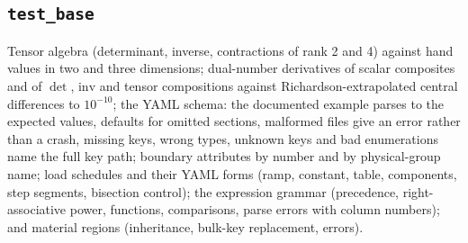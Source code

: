 \documentclass[11pt]{article}
\begin{document}
\subsection{\texttt{test\_base}}
Tensor algebra (determinant, inverse, contractions of rank 2 and 4) against
hand values in two and three dimensions; dual-number derivatives of scalar
composites and of $\det$, $\mathrm{inv}$ and tensor compositions against
Richardson-extrapolated central differences to $10^{-10}$; the YAML
schema: the documented example parses to the expected values, defaults for
omitted sections, malformed files give an error rather than a crash,
missing keys, wrong types, unknown keys and bad enumerations name the full
key path; boundary attributes by number and by physical-group name; load
schedules and their YAML forms (ramp, constant, table, components, step
segments, bisection control); the expression grammar (precedence,
right-associative power, functions, comparisons, parse errors with column
numbers); and material regions (inheritance, bulk-key replacement, errors).
\end{document}
